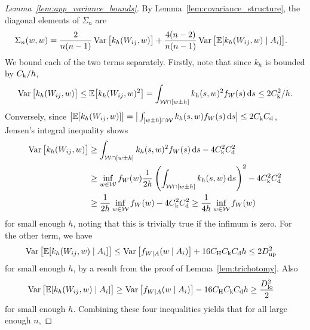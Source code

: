\begin{proof}[Lemma~\ref{lem:app_variance_bounds}]

  By Lemma~\ref{lem:covariance_structure},
  the diagonal elements of $\Sigma_n$ are
  \begin{align*}
    \Sigma_n(w,w)
    &=
    \frac{2}{n(n-1)}
    \operatorname{Var}\big[
      k_h(W_{ij},w)
      \big]
    +
    \frac{4(n-2)}{n(n-1)}
    \operatorname{Var}\big[
      \mathbb{E}[k_h(W_{ij},w) \mid A_i]
      \big].
  \end{align*}
  We bound each of the two terms separately.
  Firstly, note that since $k_h$ is bounded by $C_\mathrm{k}/h$,
  \begin{align*}
    \operatorname{Var}\big[
      k_h(W_{ij},w)
      \big]
    \leq
    \mathbb{E}\big[
      k_h(W_{ij},w)^2
      \big]
    =
    \int_{\mathcal{W} \cap [w \pm h]}
    k_h(s,w)^2
    f_W(s)
    \,\mathrm{d}s
    \leq 2 C_\mathrm{k}^2 / h.
  \end{align*}
  Conversely, since
  $\big|\mathbb{E}[k_h(W_{ij},w)]\big|
  = \big|\int_{[w \pm h] \cap \mathcal{W}} k_h(s,w) f_W(s) \,\mathrm{d}s\big|
  \leq 2 C_\mathrm{k} C_\mathrm{d}$,
  Jensen's integral inequality shows
  \begin{align*}
    \operatorname{Var}\big[
      k_h(W_{ij},w)
      \big]
    &\geq
    \int_{\mathcal{W} \cap [w \pm h]}
    k_h(s,w)^2
    f_W(s)
    \,\mathrm{d}s
    - 4 C_\mathrm{k}^2 C_\mathrm{d}^2 \\
    &\geq
    \inf_{w \in \mathcal{W}} f_W(w)
    \frac{1}{2h}
    \left(
      \int_{\mathcal{W} \cap [w \pm h]}
      k_h(s,w)
      \,\mathrm{d}s
    \right)^2
    - 4 C_\mathrm{k}^2 C_\mathrm{d}^2 \\
    &\geq
    \frac{1}{2h}
    \inf_{w \in \mathcal{W}} f_W(w)
    - 4 C_\mathrm{k}^2 C_\mathrm{d}^2
    \geq
    \frac{1}{4h}
    \inf_{w \in \mathcal{W}} f_W(w)
  \end{align*}
  for small enough $h$, noting that this is trivially true
  if the infimum is zero.
  For the other term, we have
  \begin{align*}
    \operatorname{Var}\big[
      \mathbb{E}[k_h(W_{ij},w) \mid A_i]
      \big]
    &\leq
    \operatorname{Var}\big[
      f_{W \mid A}(w \mid A_i)
      \big]
    + 16 C_\mathrm{H} C_\mathrm{k} C_\mathrm{d} h
    \leq
    2 D_{\textup{up}}^2
  \end{align*}
  for small enough $h$, by a result from
  the proof of Lemma~\ref{lem:trichotomy}.
  Also
  \begin{align*}
    \operatorname{Var}\big[
      \mathbb{E}[k_h(W_{ij},w) \mid A_i]
      \big]
    &\geq
    \operatorname{Var}\big[
      f_{W \mid A}(w \mid A_i)
      \big]
    - 16 C_\mathrm{H} C_\mathrm{k} C_\mathrm{d} h
    \geq
    \frac{D_{\textup{lo}}^2}{2}
  \end{align*}
  for small enough $h$.
  Combining these four inequalities yields
  that for all large enough $n$,

\end{proof}
